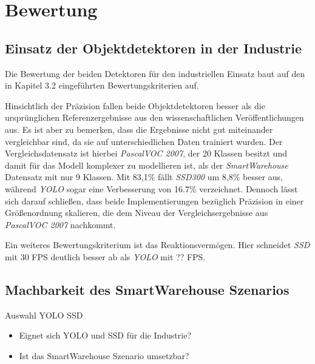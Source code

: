 \chapter{Bewertung}

\section{Einsatz der Objektdetektoren in der Industrie}

Die Bewertung der beiden Detektoren für den industriellen Einsatz baut auf den in Kapitel 3.2 eingeführten Bewertungskriterien auf. 

Hinsichtlich der Präzision fallen beide Objektdetektoren besser als die ursprünglichen Referenzergebnisse aus den wissenschaftlichen Veröffentlichungen aus. Es ist aber zu bemerken, dass die Ergebnisse nicht gut miteinander vergleichbar sind, da sie auf unterschiedlichen Daten trainiert wurden. Der Vergleichsdatensatz ist hierbei \textit{PascalVOC 2007}, der 20 Klassen besitzt und damit für das Modell komplexer zu modellieren ist, als der \textit{SmartWarehouse} Datensatz mit nur 9 Klassen. Mit 83,1\% fällt \textit{SSD300} um 8,8\% besser aus, während \textit{YOLO} sogar eine Verbesserung von 16.7\% verzeichnet. Dennoch lässt sich darauf schließen, dass beide Implementierungen bezüglich Präzision in einer Größenordnung skalieren, die dem Niveau der Vergleichsergebnisse aus \textit{PascalVOC 2007} nachkommt. 

Ein weiteres Bewertungskriterium ist das Reaktionsvermögen. Hier schneidet \textit{SSD} mit 30 FPS deutlich besser ab als \textit{YOLO} mit ?? FPS. 



\section{Machbarkeit des SmartWarehouse Szenarios}

Auswahl YOLO SSD

\begin{itemize}
	\item Eignet sich YOLO und SSD für die Industrie?
	\item Ist das SmartWarehouse Szenario umsetzbar?
\end{itemize}

